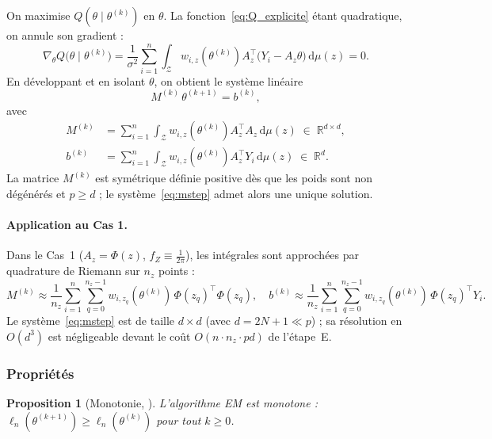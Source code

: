 \documentclass[12pt, a4paper]{article}
\newtheorem{proposition}[theorem]{Proposition}
\theoremstyle{definition}
\newcommand{\R}{\mathbb{R}}
\newcommand{\Zcal}{\mathcal{Z}}
\begin{document}
On maximise $Q(\theta \mid \theta^{(k)})$ en $\theta$. La fonction~\eqref{eq:Q_explicite} étant quadratique, on annule son gradient :
\[
    \nabla_\theta Q\bigl(\theta \mid \theta^{(k)}\bigr)
    = \frac{1}{\sigma^2}
      \sum_{i=1}^{n} \int_\Zcal w_{i,z}\!\left(\theta^{(k)}\right)
      A_z^\top\bigl(Y_i - A_z\theta\bigr)\,\mathrm{d}\mu(z) = 0.
\]
En développant et en isolant $\theta$, on obtient le système linéaire
\begin{equation}
    M^{(k)}\,\theta^{(k+1)} = b^{(k)},
    \label{eq:mstep}
\end{equation}
avec
\begin{align}
    M^{(k)}
    &= \sum_{i=1}^{n} \int_\Zcal w_{i,z}\!\left(\theta^{(k)}\right) A_z^\top A_z\,\mathrm{d}\mu(z)
    \;\in\; \R^{d \times d}, \label{eq:Mk} \\
    b^{(k)}
    &= \sum_{i=1}^{n} \int_\Zcal w_{i,z}\!\left(\theta^{(k)}\right) A_z^\top Y_i\,\mathrm{d}\mu(z)
    \;\in\; \R^d. \label{eq:bk}
\end{align}
La matrice $M^{(k)}$ est symétrique définie positive dès que les poids sont non dégénérés et $p \geq d$ ; le système~\eqref{eq:mstep} admet alors une unique solution.

\paragraph{Application au Cas 1.}
Dans le Cas~1 ($A_z = \Phi(z)$, $f_Z \equiv \frac{1}{2\pi}$), les intégrales sont approchées par quadrature de Riemann sur $n_z$ points :
\[
    M^{(k)} \approx \frac{1}{n_z}\sum_{i=1}^{n}\sum_{q=0}^{n_z-1}
    w_{i,z_q}\!\left(\theta^{(k)}\right)\,\Phi(z_q)^\top\Phi(z_q),
    \quad
    b^{(k)} \approx \frac{1}{n_z}\sum_{i=1}^{n}\sum_{q=0}^{n_z-1}
    w_{i,z_q}\!\left(\theta^{(k)}\right)\,\Phi(z_q)^\top Y_i.
\]
Le système~\eqref{eq:mstep} est de taille $d \times d$ (avec $d = 2N+1 \ll p$) ; sa résolution en $O(d^3)$ est négligeable devant le coût $O(n \cdot n_z \cdot pd)$ de l'étape~E.

\subsubsection{Propriétés}

\begin{proposition}[Monotonie, \cite{dempster1977maximum}]
\label{prop:em_monotonie}
L'algorithme EM est monotone : $\ell_n(\theta^{(k+1)}) \geq \ell_n(\theta^{(k)})$ pour tout $k \geq 0$.
\end{proposition}
\end{document}
